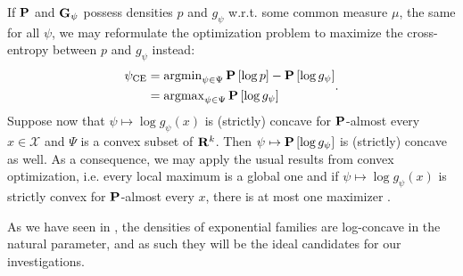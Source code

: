 If $\P$ and $\G_{\psi}$ possess densities $p$ and $g_{\psi}$ w.r.t. some common measure $\mu$, the same for all $\psi$, we may reformulate the optimization problem to maximize the cross-entropy between $p$ and $g_{\psi}$ instead:
\begin{align}
    \begin{split}
    \psi_{\text{CE}} &= \argmin_{\psi \in \Psi} \P \left[\log p \right] - \P \left[\log g_{\psi}\right] \\
    &= \argmax_{\psi \in \Psi} \P \left[\log g_{\psi}\right]
    \end{split} \label{eq:ce_argmax}.
\end{align}
Suppose now that $\psi \mapsto \log g_{\psi}(x)$ is (strictly) concave for $\P$-almost every $x \in \mathcal X$ and $\Psi$ is a convex subset of $\R^{k}$. Then $\psi \mapsto \P \left[\log g_{\psi}\right]$ is (strictly) concave as well. As a consequence, we may apply the usual results from convex optimization, i.e. every local maximum is a global one and if $\psi \mapsto \log g_{\psi}(x)$ is strictly convex for $\P$-almost every $x$, there is at most one maximizer \citep[Theorem 3.4.2]{Bazaraa2006Nonlinear}.

As we have seen in , the densities of exponential families are log-concave in the natural parameter, and as such they will be the ideal candidates for our investigations. 

%
%
%    

